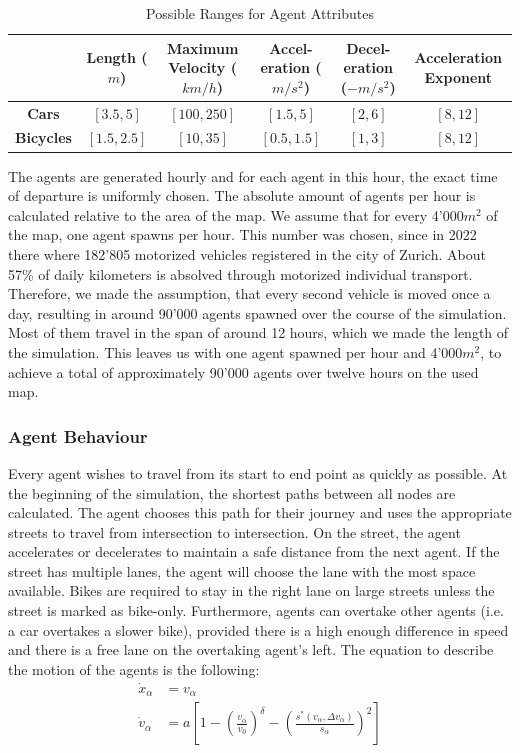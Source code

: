 \begin{table}[H]
\begin{center}
\begin{tabularx}{\linewidth}{C|C|C|C|C|C}
    & \textbf{Length} ($m$) & \textbf{Maximum Velocity} ($km/h$) & \textbf{Accel-} \textbf{eration} ($m/s^2$) & \textbf{Decel-} \textbf{eration} ($-m/s^2$) & \textbf{Acceleration Exponent}\\
    \hline
    \textbf{Cars} & $[3.5, 5]$ & $[100, 250]$ & $[1.5, 5]$ & $[2, 6]$ & $[8, 12]$\\
    \hline
    \textbf{Bicycles} & $[1.5, 2.5]$ & $[10, 35]$ & $[0.5, 1.5]$ & $[1, 3]$ & $[8, 12]$
\end{tabularx}
\caption{Possible Ranges for Agent Attributes}\label{tab:agentAttr.}
\end{center}
\end{table}
\vspace{-0.75cm}
The agents are generated hourly and for each agent in this hour, the exact time of departure is uniformly chosen. The absolute amount of agents per hour is calculated relative to the area of the map. We assume that for every 4'000$m^2$ of the map, one agent spawns per hour. This number was chosen, since in 2022 there where 182'805  motorized vehicles registered in the city of Zurich. \cite{carAmount} About 57\% of daily kilometers is absolved through motorized individual transport. \cite{verhalten} Therefore, we made the assumption, that every second vehicle is moved once a day, resulting in around 90'000 agents spawned over the course of the simulation. Most of them travel in the span of around 12 hours, which we made the length of the simulation. This leaves us with one agent spawned per hour and 4'000$m^2$, to achieve a total of approximately 90'000 agents over twelve hours on the used map.
\subsubsection{Agent Behaviour}
Every agent wishes to travel from its start to end point as quickly as possible. At the beginning of the simulation, the shortest paths between all nodes are calculated. The agent chooses this path for their journey and uses the appropriate streets to travel from intersection to intersection. On the street, the agent accelerates or decelerates to maintain a safe distance from the next agent. If the street has multiple lanes, the agent will choose the lane with the most space available. Bikes are required to stay in the right lane on large streets unless the street is marked as bike-only. Furthermore, agents can overtake other agents (i.e. a car overtakes a slower bike), provided there is a high enough difference in speed and there is a free lane on the overtaking agent's left. The equation to describe the motion of the agents is the following: \cite{helbl}
\begin{align*}
\dot{x}_\alpha &= v_\alpha\\
\dot{v}_\alpha &= a\left[ 1 - \left( \frac{v_\alpha}{v_0}\right)^\delta - \left(\frac{s^*(v_\alpha, \Delta v_\alpha)}{s_\alpha} \right)^2 \right]
\end{align*}

